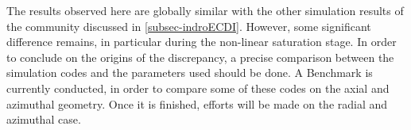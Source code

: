   
  The results observed here are globally similar with the other simulation results of the community discussed in \cref{subsec-indroECDI}.
  However, some significant difference remains, in particular during the non-linear saturation stage.
  In order to conclude on the origins of the discrepancy, a precise comparison between the simulation codes and the parameters used should be done.
  A Benchmark is currently conducted, in order to compare some of these codes on the axial and azimuthal geometry.
  Once it is finished, efforts will be made on the radial and azimuthal case.
  
  
